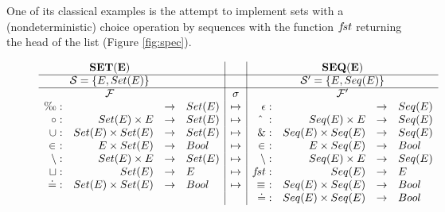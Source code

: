 One of its classical examples is the attempt to implement sets with a (nondeterministic) choice operation by sequences with the function $f\!st$ returning the head of the list (Figure \ref{fig:spec}). \begin{figure}[hbt] \centering
\( \begin{array}{rrcl|c|rrcl}
\multicolumn{3}{c}{{\bf SET(E)}} & & &
\multicolumn{4}{c}{{\bf SEQ(E)}} \\ \cline{1-9} \multicolumn{3}{c}{\Sorts=\{E,Set(E)\}} & & & 
\multicolumn{4}{c}{\Sorts'=\{E,Seq(E)\}} \\ \cline{1-9} \multicolumn{3}{c}{\Funcs} & & \sigma & \multicolumn{4}{c}{\Funcs'} \\ \es:& &\into& Set(E) & \Seq &	\epsilon:& &\into & Seq(E)\\
\ap :&Set(E)\times E&\into &Set(E) & \Seq & \lap\ :& Seq(E)\times E& \into & Seq(E)\\
\cup: & Set(E)\times Set(E) & \into & Set(E) & \Seq & \&: & Seq(E)\times Seq(E)
& \into & Seq(E) \\
\in\ : & E\times Set(E) & \into & Bool & \Seq & \in\ : & E\times Seq(E) & \into & Bool \\
\setminus : & Set(E)\times E & \into & Set(E) & \Seq & \setminus : & Seq(E)\times E & \into & Seq(E) \\
\ch: & Set(E) & \into & E & \Seq &	\fst: & Seq(E) & \into & E\\
\Eq: & Set(E)\times Set(E) & \into & Bool& \Seq & 
\equiv\ : & Seq(E)\times Seq(E) & \into & Bool\\
& & & &	&	\Eq : & Seq(E)\times Seq(E) & \into & Bool
\end{array} \)


\end{figure}
